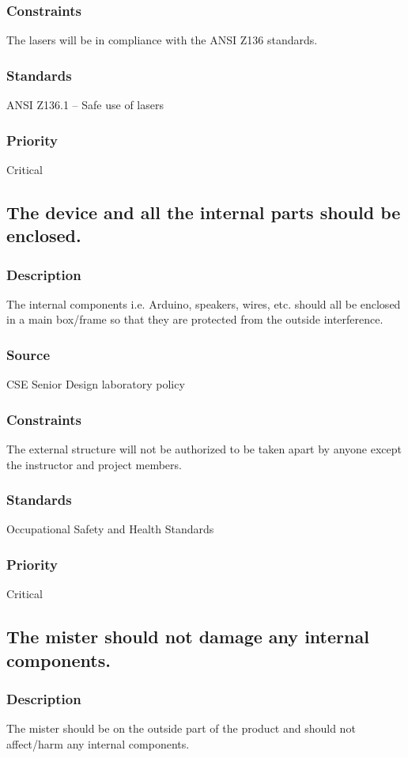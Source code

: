 \subsubsection{Constraints}
The lasers will be in compliance with the ANSI Z136 standards.
\subsubsection{Standards}
ANSI Z136.1 – Safe use of lasers
\subsubsection{Priority}
Critical

\subsection{The device and all the internal parts should be enclosed.}
\subsubsection{Description}
The internal components i.e. Arduino, speakers, wires, etc. should all be enclosed in a main box/frame so that they are protected from the outside interference.
\subsubsection{Source}
CSE Senior Design laboratory policy
\subsubsection{Constraints}
The external structure will not be authorized to be taken apart by anyone except the instructor and project members.
\subsubsection{Standards}
Occupational Safety and Health Standards
\subsubsection{Priority}
Critical

\subsection{The mister should not damage any internal components.}
\subsubsection{Description}
The mister should be on the outside part of the product and should not affect/harm any internal components.
